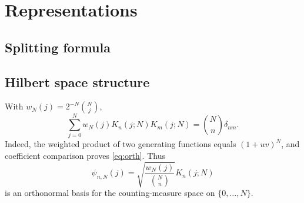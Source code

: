 \chapter{Representations}
\label{ch:8}
\section{Splitting formula}
\label{sec:8-1}

\section{Hilbert space structure}
\label{sec:8-2}
With $w_N(j)=2^{-N}\binom Nj$,
\begin{equation}\label{eq:orth}
\sum_{j=0}^Nw_N(j)K_n(j;N)K_m(j;N)=\binom Nn\delta_{nm}.
\end{equation}
Indeed, the weighted product of two generating functions equals $(1+uv)^N$, and coefficient comparison proves \eqref{eq:orth}. Thus
\[
\psi_{n,N}(j)=\sqrt{\frac{w_N(j)}{\binom Nn}}K_n(j;N)
\]
is an orthonormal basis for the counting-measure space on $\{0,\ldots,N\}$.

